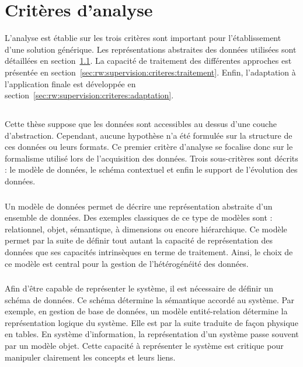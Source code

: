 \section{Critères d'analyse}\label{sec:rw:supervision:criteres}
L'analyse est établie sur les trois critères sont important pour l'établissement d'une solution générique. Les représentations abstraites des données utilisées sont détaillées en section~\ref{sec:rw:supervision:criteres:structure}. La capacité de traitement des différentes approches est présentée en section~\ref{sec:rw:supervision:criteres:traitement}. Enfin, l'adaptation à l'application finale est développée en section~\ref{sec:rw:supervision:criteres:adaptation}.

\subsection{\critereA}\label{sec:rw:supervision:criteres:structure}
Cette thèse suppose que les données sont accessibles au dessus d'une couche d'abstraction. Cependant, aucune hypothèse n'a été formulée sur la structure de ces données ou leurs formats. Ce premier critère d'analyse se focalise donc sur le formalisme utilisé lors de l'acquisition des données. Trois sous-critères sont décrits : le modèle de données, le schéma contextuel et enfin le support de l'évolution des données.

\subsubsection{\critereAA}
Un modèle de données permet de décrire une représentation abstraite d'un ensemble de données. Des exemples classiques de ce type de modèles sont : relationnel, objet, sémantique, à dimensions ou encore hiérarchique. Ce modèle permet par la suite de définir tout autant la capacité de représentation des données que ses capacités intrinsèques en terme de traitement. Ainsi, le choix de ce modèle est central pour la gestion de l'hétérogénéité des données.

\subsubsection{\critereAB}
Afin d'être capable de représenter le système, il est nécessaire de définir un schéma de données. Ce schéma détermine la sémantique accordé au système. Par exemple, en gestion de base de données, un modèle entité-relation détermine la représentation logique du système. Elle est par la suite traduite de façon physique en tables. En système d'information, la représentation d'un système passe souvent par un modèle objet. Cette capacité à représenter le système est critique pour manipuler clairement les concepts et leurs liens.

